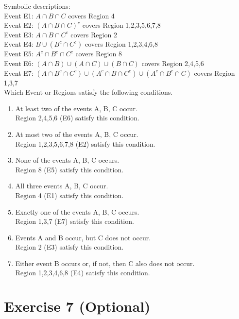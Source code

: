 \documentclass[12pt,thmsa]{article}\usepackage[]{graphicx}\usepackage[]{color}
\begin{document}
\noindent Symbolic descriptions: \\
Event E1: $A \cap B \cap C$ covers Region {4}\\
Event E2: $(A\cap B \cap C)^c $ covers Region {1,2,3,5,6,7,8} \\
Event E3: $ A \cap B \cap C^c $ covers Region {2} \\
Event E4: $B \cup (B^c \cap C^c)$ covers Region {1,2,3,4,6,8}\\
Event E5: $A^c \cap B^c \cap C^c $ covers Region {8} \\
Event E6: $(A \cap B) \cup (A \cap C) \cup (B \cap C)$ covers Region {2,4,5,6} \\
Event E7: $(A \cap B^c \cap C^c) \cup (A^c \cap B \cap C^c) \cup (A^c \cap B^c \cap C) $ covers Region {1,3,7}\\

\noindent Which Event or Regions satisfy the following conditions.
\begin{enumerate}
\item At least two of the events A, B, C occur. \\
Region {2,4,5,6} (E6) satisfy this condition.
\item At most two of the events A, B, C occur. \\
Region {1,2,3,5,6,7,8} (E2) satisfy this condition.
\item None of the events A, B, C occurs. \\
Region {8} (E5) satisfy this condition.
\item All three events A, B, C occur. \\
Region {4} (E1) satisfy this condition.
\item Exactly one of the events A, B, C occurs.\\
Region {1,3,7} (E7) satisfy this condition.
\item Events A and B occur, but C does not occur. \\
Region {2} (E3) satisfy this condition.
\item Either event B occurs or, if not, then C also does not occur.\\
Region {1,2,3,4,6,8} (E4) satisfy this condition.


\end{enumerate}

\section*{Exercise 7 (Optional)}
\end{document}
